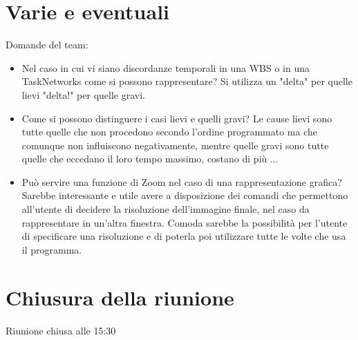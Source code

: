 \section*{Varie e eventuali}
Domande del team:
\begin{itemize}
  \item Nel caso in cui vi siano discordanze temporali in una WBS o in una TaskNetworks come si possono rappresentare?
   Si utilizza un "delta" per quelle lievi "delta!" per quelle gravi.  
  \item Come si possono distinguere i casi lievi e quelli gravi? 
	 Le cause lievi sono tutte quelle che non procedono secondo l'ordine programmato ma che comunque non influiscono
	 negativamente, mentre quelle gravi sono tutte quelle che eccedano il loro tempo massimo, costano di più ...
  \item Può servire una funzione di Zoom nel caso di una rappresentazione grafica?
	 Sarebbe interessante e utile avere a disposizione dei comandi che permettono all'utente di decidere la risoluzione
	 dell'immagine finale, nel caso da rappresentare in un'altra finestra. Comoda sarebbe la possibilità per l'utente
	 di specificare una risoluzione e di poterla poi utilizzare tutte le volte che usa il programma.   
\end{itemize}

\section*{Chiusura della riunione}
Riunione chiusa alle 15:30
